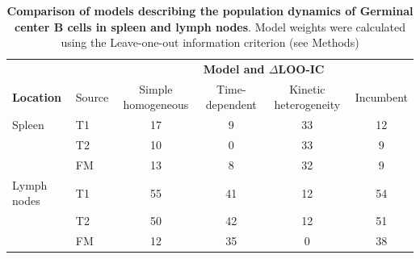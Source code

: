 \documentclass[11pt]{article}
\newcommand{\looic}{$\Delta$LOO-IC}
\begin{document}
	\begin{table}[htbp]
		\begin{center}
			\renewcommand{\arraystretch}{1.25}
			\begin{tabular}{l l c c c c} 
				\toprule 
				&         & \multicolumn{4}{c}{\textbf{Model and {\looic}}} \\
				\cline{3-6}
				\textbf{Location} & Source     & {\small Simple homogeneous}&  {\small Time-dependent}    & {\small Kinetic heterogeneity} & {\small Incumbent} \\ 
				\toprule
				Spleen &   T1    &   17           &          9            &           33         &          12        \\ 
				     &   T2    &   10           &          0            &           33         &          9         \\ 
				     &   FM    &   13           &          8            &           32         &          9         \\ 
				\hline
				Lymph nodes &   T1    &   55           &          41           &           12         &          54        \\ 
				     &   T2    &   50           &          42           &           12         &          51        \\ 
				     &   FM    &   12           &          35           &           0          &          38        \\ 
				\hline
				\toprule 
			\end{tabular}
		\end{center}
		\caption{ \textbf{Comparison of models describing the population dynamics of Germinal center B cells in spleen and lymph nodes}. Model weights were calculated using the Leave-one-out information criterion (see Methods)} 
		\label{tab:GC-AICs}
	\end{table} 



	
\end{document}
